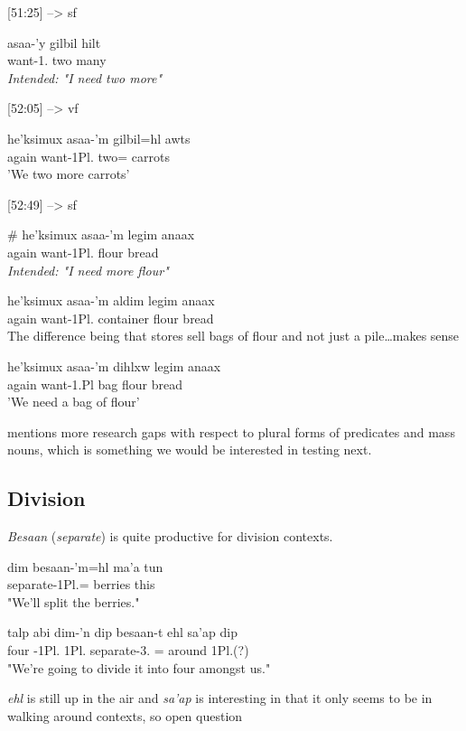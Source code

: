 \documentclass{article}
\begin{document}
[51:25] --> sf
\begin{exe}
    \ex \gll * asaa-'y gilbil hilt\\
    {} want-1.\Ii{} two many\\
\textit{Intended: "I need two more"}
\end{exe}

[52:05] --> vf
\begin{exe}
\ex \gll he'ksimux asaa-'m gilbil=hl awts\\
again want-1Pl.\Ii{} two=\Cn{} carrots\\
'We two more carrots'
\end{exe}

[52:49] --> sf
\begin{exe}
\ex \begin{xlist}
\item \gll \# he'ksimux asaa-'m legim anaax\\
{} again want-1Pl.\Ii{} flour bread\\
\textit{Intended: "I need more flour"}
\item \gll he'ksimux asaa-'m aldim legim anaax\\
again want-1Pl.\Ii{} container flour bread\\
The difference being that stores sell bags of flour and not just a pile\dots makes sense
\item \gll he'ksimux asaa-'m dihlxw legim anaax\\
again want-1.Pl\Ii{} bag flour bread\\
'We need a bag of flour'
\end{xlist}
\end{exe}

\textcite[306]{bicevskisQuantificationGitksan2017} mentions more research gaps with respect to plural forms of predicates and mass nouns, which is something we would be interested in testing next.

\subsection{Division}
\textit{Besaan} (\textit{separate}) is quite productive for division contexts.
\begin{exe}
\ex \gll dim besaan-'m=hl ma'a tun\\
\Fut{} separate-1Pl.\Ii{}=\Cn{} berries this\\
\glt "We'll split the berries."
\end{exe}
\begin{exe}
\ex \gll talp abi dim-'n dip besaan-t ehl sa'ap dip\\
four \Cnt{} \Fut{}-1Pl.\I{} 1Pl.\I{} separate-3.\Ii{} \Prep[-3.\Ii]=\Cn{}  around 1Pl.\Ii{}(?)\\
"We're going to divide it into four amongst us."
\end{exe}
\textit{ehl} is still up in the air and \textit{sa'ap} is interesting in that it only seems to be in walking around contexts, so open question
\end{document}

